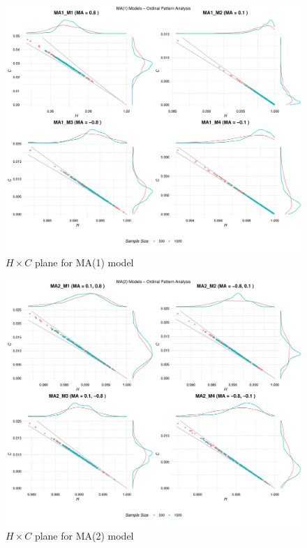 \documentclass[12pt,a4paper]{article}
\begin{document}
\begin{figure}[H]
	\includegraphics[width=0.9 \textwidth]{MA1_combined_analysis}
	\caption{$H \times C$ plane for MA(1) model}
	\label{fig:HC MA(1)}
\end{figure}

\begin{figure}[H]
	\includegraphics[width=0.9 \textwidth]{MA2_combined_analysis}
	\caption{$H \times C$ plane for MA(2) model}
	\label{fig:HC MA(2)}
\end{figure}			
	
\end{document}

